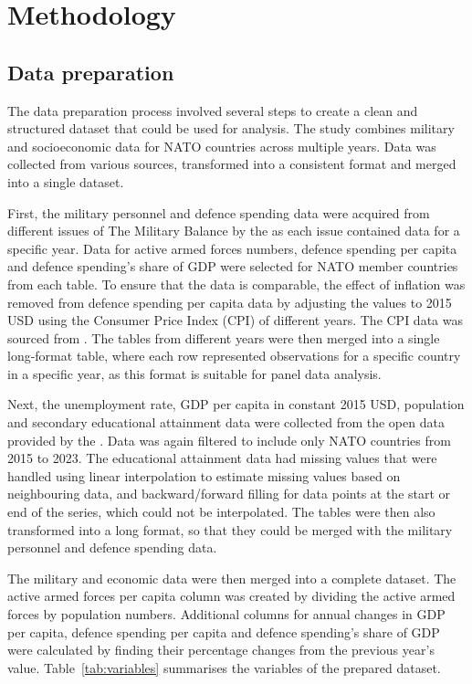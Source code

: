 \chapter{Methodology}

\section{Data preparation}

The data preparation process involved several steps to create a clean and structured dataset that could be used for analysis. 
The study combines military and socioeconomic data for NATO countries across multiple years. 
Data was collected from various sources, transformed into a consistent format and merged into a single dataset.

First, the military personnel and defence spending data were acquired from different issues of The Military Balance by the \textcite{noauthor_military_balance_nodate} as each issue contained data for a specific year. 
Data for active armed forces numbers, defence spending per capita and defence spending's share of GDP were selected for NATO member countries from each table.
To ensure that the data is comparable, the effect of inflation was removed from defence spending per capita data by adjusting the values to 2015 USD using the Consumer Price Index (CPI) of different years. 
The CPI data was sourced from \textcite{federal_reserve_bank_of_minneapolis_consumer_nodate}. 
The tables from different years were then merged into a single long-format table, where each row represented observations for a specific country in a specific year, as this format is suitable for panel data analysis.

Next, the unemployment rate, GDP per capita in constant 2015 USD, population and secondary educational attainment data were collected from the open data provided by the \textcite{noauthor_world_bank_nodate}. 
Data was again filtered to include only NATO countries from 2015 to 2023. 
The educational attainment data had missing values that were handled using linear interpolation to estimate missing values based on neighbouring data, and backward/forward filling for data points at the start or end of the series, which could not be interpolated. 
The tables were then also transformed into a long format, so that they could be merged with the military personnel and defence spending data.

The military and economic data were then merged into a complete dataset. 
The active armed forces per capita column was created by dividing the active armed forces by population numbers.
Additional columns for annual changes in GDP per capita, defence spending per capita and defence spending's share of GDP were calculated by finding their percentage changes from the previous year's value. 
Table~\ref{tab:variables} summarises the variables of the prepared dataset.

